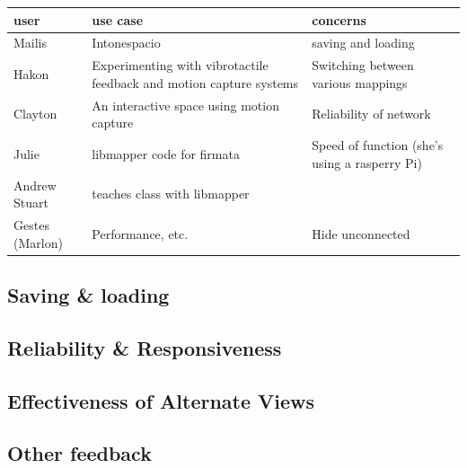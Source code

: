 \begin{table}
\begin{center}
\begin{tabular}{l p{5cm} p{5cm}}
	\hline\hline
	user&use case&concerns\\
	\hline
	Mailis&Intonespacio&saving and loading\\
	Hakon&Experimenting with vibrotactile feedback and motion capture systems&Switching between various mappings\\
	Clayton&An interactive space using motion capture&Reliability of network\\
	Julie&libmapper code for firmata&Speed of function (she's using a rasperry Pi)\\
	\hline
	Andrew Stuart&teaches class with libmapper&\\
	Gestes (Marlon)&Performance, etc.&Hide unconnected\\
\end{tabular}
\end{center}	
\end{table}



	\subsection{Saving \& loading} %
	\label{sub:saving_and_loading}
	

	\subsection{Reliability \& Responsiveness} %
	\label{sub:reliability_and_responsiveness}
	

	\subsection{Effectiveness of Alternate Views} %
	\label{sub:effectiveness_of_alternate_views}
	

	\subsection{Other feedback} %
	\label{sub:other_feedback}
	
